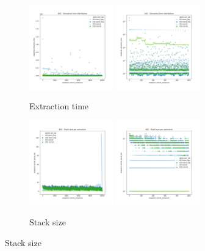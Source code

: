 \begin{figure}
    \begin{subfigure}[b]{\textwidth}
        \centering
        \includegraphics[width=0.40\textwidth]{./fragments/04_experimental_execution/images/02_benchmark_02_sort_a_case.png.1_0.png}
        \includegraphics[width=0.40\textwidth]{./fragments/04_experimental_execution/images/02_benchmark_02_sort_a_case.png.1_1.png}
        \caption{Extraction time}
        \label{FIG:PARTITION_SCHEME_01_ASCENDING__0_0}
    \end{subfigure}

    \begin{subfigure}[b]{\textwidth}
        \centering
        \includegraphics[width=0.40\textwidth]{./fragments/04_experimental_execution/images/02_benchmark_02_sort_a_case.png.2_0.png}
        \includegraphics[width=0.40\textwidth]{./fragments/04_experimental_execution/images/02_benchmark_02_sort_a_case.png.2_1.png}
        \caption{Stack size}
        \label{FIG:PARTITION_SCHEME_01_ASCENDING__0_0}
    \end{subfigure}
    

\end{figure}
